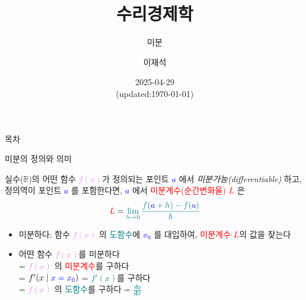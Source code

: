 \documentclass[aspectratio=169]{beamer}
\title{수리경제학}
\subtitle{미분}
\author{이재석}
\date{2025-04-29 \\ (updated:\today)}
\begin{document}
\begin{frame}
  \titlepage
\end{frame}

\begin{frame}{목차}
  \tableofcontents
\end{frame}




% 
%  
\begin{frame}{미분의 정의와 의미}
  \begin{definition}[도함수]
    실수($\mathbb{R}$)의 어떤 함수 \textcolor{violet}{$f(x)$}가 정의되는 포인트 \textcolor{blue}{\emph{$a$}} 에서 \emph{미분가능(differentiable)} 하고, 정의역이 포인트 \textcolor{blue}{\emph{$a$}} 를 포함한다면, \textcolor{blue}{\emph{$a$}} 에서 \textcolor{red}{미분계수(순간변화율)} \textcolor{red}{\emph{$L$}} 은 \\
    \begin{equation}
      \textcolor{red}{L} = \textcolor{teal}{\lim_{h \to 0} \frac{f(\textcolor{blue}{a}+h)-f(\textcolor{blue}{a})}{h}}
    \end{equation}
  \end{definition}
  \begin{itemize}
    \item 미분하다: 함수 \textcolor{violet}{$f(x)$} 의 \textcolor{teal}{도함수}에 \textcolor{blue}{\emph{$x_0$}} 를 대입하여, \textcolor{red}{미분계수 $L$}의 값을 찾는다
    \item 어떤 함수 \textcolor{violet}{$f(x)$}를 미분하다 \\
    = \textcolor{violet}{$f(x)$} 의 \textcolor{red}{미분계수}를 구하다 \\
    = \textcolor{teal}{$f'(x \mid \textcolor{blue}{x = x_0})$}
    = \textcolor{teal}{$f'(x)$}를 구하다 \\
    = \textcolor{violet}{$f(x)$} 의 \textcolor{teal}{도함수}를 구하다 
    = \textcolor{teal}{$\frac{\mathbf{d}y}{\mathbf{d}x}$}
  \end{itemize}
\end{frame}




\end{document}
